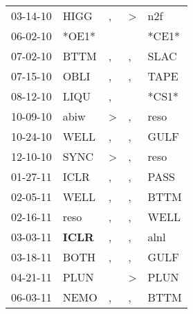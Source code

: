 \begin{supertabular}{p{0.07\textwidth}p{0.06\textwidth}p{0.02\textwidth}p{0.02\textwidth}p{0.06\textwidth}}
          03-14-10\textsuperscript{} &           HIGG\textsuperscript{} &                , &  \textgreater &            n2f\textsuperscript{} \\
          06-02-10\textsuperscript{} &                            *OE1* &                  &               &                            *CE1* \\
          07-02-10\textsuperscript{} &           BTTM\textsuperscript{} &                , &             , &           SLAC\textsuperscript{} \\
          07-15-10\textsuperscript{} &           OBLI\textsuperscript{} &                , &             , &           TAPE\textsuperscript{} \\
          08-12-10\textsuperscript{} &           LIQU\textsuperscript{} &                , &               &                            *CS1* \\
          10-09-10\textsuperscript{} &           abiw\textsuperscript{} &     \textgreater &             , &           reso\textsuperscript{} \\
          10-24-10\textsuperscript{} &           WELL\textsuperscript{} &                , &             , &           GULF\textsuperscript{} \\
          12-10-10\textsuperscript{} &           SYNC\textsuperscript{} &     \textgreater &             , &           reso\textsuperscript{} \\
          01-27-11\textsuperscript{} &           ICLR\textsuperscript{} &                , &             , &           PASS\textsuperscript{} \\
          02-05-11\textsuperscript{} &           WELL\textsuperscript{} &                , &             , &           BTTM\textsuperscript{} \\
          02-16-11\textsuperscript{} &           reso\textsuperscript{} &                , &             , &           WELL\textsuperscript{} \\
          03-03-11\textsuperscript{} &  \textbf{ICLR\textsuperscript{}} &                , &             , &           alnl\textsuperscript{} \\
          03-18-11\textsuperscript{} &           BOTH\textsuperscript{} &                , &             , &           GULF\textsuperscript{} \\
          04-21-11\textsuperscript{} &           PLUN\textsuperscript{} &                  &  \textgreater &           PLUN\textsuperscript{} \\
          06-03-11\textsuperscript{} &           NEMO\textsuperscript{} &                , &             , &           BTTM\textsuperscript{} \\

\end{supertabular}
